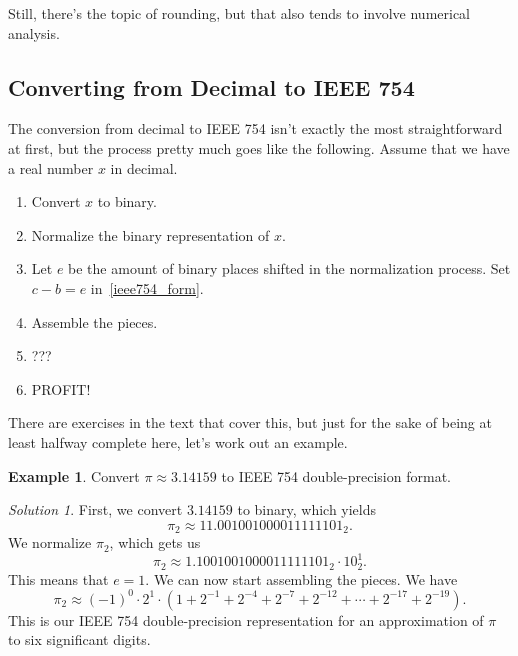 \documentclass[letterpaper,12pt]{article}
\theoremstyle{remark}
\newtheorem*{sola}{Solution}
\theoremstyle{definition}
\newtheorem*{exma}{Example}
\begin{document}
Still, there's the topic of rounding, but that also tends to involve
numerical analysis.

\subsection{Converting from Decimal to IEEE 754}

The conversion from decimal to IEEE 754 isn't exactly the most
straightforward at first, but the process pretty much goes like the
following.  Assume that we have a real number $x$ in decimal.
\begin{enumerate}
\item Convert $x$ to binary.
\item Normalize the binary representation of $x$.
\item Let $e$ be the amount of binary places shifted in the
  normalization process.  Set $c-b=e$ in~\eqref{ieee754_form}.
\item Assemble the pieces.
\item ???
\item PROFIT!
\end{enumerate}
There are exercises in the text that cover this, but just for the sake
of being at least halfway complete here, let's work out an example.
\begin{exma}
  Convert $\pi\approx 3.14159$ to IEEE 754 double-precision format.
\end{exma}
\begin{sola}
  First, we convert $3.14159$ to binary, which yields
  \begin{equation*}
    \pi_2\approx 11.001001000011111101_2.
  \end{equation*}
  We normalize $\pi_2$, which gets us
  \begin{equation*}
    \pi_2\approx 1.1001001000011111101_2\cdot 10_2^{1}.
  \end{equation*}
  This means that $e=1$.  We can now start assembling the pieces.  We
  have
  \begin{equation*}
    \pi_2\approx (-1)^0\cdot 2^{1}\cdot (1+2^{-1}+2^{-4}+2^{-7}+2^{-12}+\cdots+2^{-17}+2^{-19}).
  \end{equation*}
  This is our IEEE 754 double-precision representation for an
  approximation of $\pi$ to six significant digits.
\end{sola}
\end{document}
